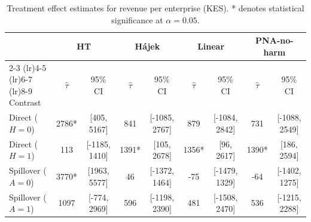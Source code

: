 \documentclass{article}
\theoremstyle{plain}
\theoremstyle{definition}
\theoremstyle{remark}
\begin{document}
\begin{table}[h!]
    \centering
    \caption{Treatment effect estimates for revenue per enterprise (KES). * denotes statistical significance at $\alpha=0.05$.}
    \label{tab:revenue_results}
    \small
    \begin{tabular}{l cc cc cc cc}
        \toprule
        & \multicolumn{2}{c}{HT} & \multicolumn{2}{c}{H\'{a}jek} & \multicolumn{2}{c}{Linear} & \multicolumn{2}{c}{PNA-no-harm} \\
        \cmidrule(lr){2-3} \cmidrule(lr){4-5} \cmidrule(lr){6-7} \cmidrule(lr){8-9}
        Contrast & $\hat\tau$ & 95\% CI & $\hat\tau$ & 95\% CI & $\hat\tau$ & 95\% CI & $\hat\tau$ & 95\% CI \\
        \midrule
        Direct ($H=0$) & 2786* & [405, 5167] & 841 & [-1085, 2767] & 879 & [-1084, 2842] & 731 & [-1088, 2549] \\
        Direct ($H=1$) & 113 & [-1185, 1410] & 1391* & [105, 2678] & 1356* & [96, 2617] & 1390* & [186, 2594] \\
        Spillover ($A=0$) & 3770* & [1963, 5577] & 46 & [-1372, 1464] & -75 & [-1479, 1329] & -64 & [-1402, 1275] \\
        Spillover ($A=1$) & 1097 & [-774, 2969] & 596 & [-1198, 2390] & 481 & [-1508, 2470] & 536 & [-1215, 2288] \\
        \bottomrule
    \end{tabular}
\end{table}



\end{document}
